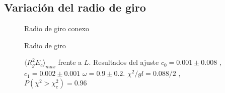 \subsection{Variación del radio de giro}

\begin{figure}[h]
  \centering
  
  \caption{Radio de giro conexo}
\end{figure}

\begin{figure}[h]
  \centering
  
  \caption{Radio de giro}
\end{figure}

\begin{figure}[h]
  \centering
  
  \caption{$\langle R_g^2 E_c\rangle_{max}$ frente a $L$. Resultados del
    ajuste $c_0=0.001\pm 0.008$ ,$c_1=0.002\pm 0.001 $ $\omega=0.9 \pm
    0.2$. $\chi^2/gl=0.088/2$ , $P(\chi^2>\chi_c^2)=0.96$ }






\end{figure}

